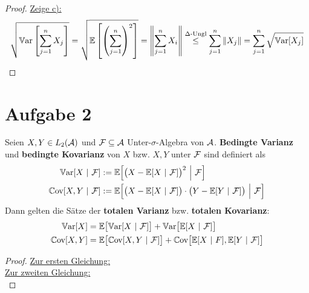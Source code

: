 \documentclass[12pt,a4paper]{article}
\begin{document}
\begin{proof}
\underline{Zeige c):}\\
\begin{align*}
\sqrt{\mathbb{V}\text{ar}\left[\sum\limits_{j=1}^n X_j\right]}
=\sqrt{\mathbb{E}\left[\left(\sum\limits_{j=1}^n\right)^2\right]}
=\left\Vert\sum\limits_{j=1}^n X_i\right\Vert
\stackrel{\Delta\text{-Ungl}}{\leq}
\sum\limits_{j=1}^n\Vert X_j\Vert
=\sum\limits_{j=1}^n\sqrt{\mathbb{V}\text{ar}[X_j]}
\end{align*}
\end{proof}

\section*{Aufgabe 2}
Seien $X,Y\in L_2(\mathcal{A})$ und $\mathcal{F}\subseteq\mathcal{A}$ Unter-$\sigma$-Algebra von $\mathcal{A}$. \textbf{Bedingte Varianz} und \textbf{bedingte Kovarianz} von $X$ bzw. $X,Y$ unter $\mathcal{F}$ sind definiert als
\begin{align*}
\mathbb{V}\text{ar}[X~|~\mathcal{F}]&:=\mathbb{E}\Big[\big(X-\mathbb{E}[X~|~\mathcal{F}]\big)^2~\Big|~\mathcal{F}\Big]\\
\mathbb{C}\text{ov}[X,Y~|~\mathcal{F}]&:=\mathbb{E}\Big[\big(X-\mathbb{E}[X~|~\mathcal{F}]\big)\cdot\big(Y-\mathbb{E}[Y~|~\mathcal{F}]\big)~\Big|~\mathcal{F}\Big]
\end{align*}
Dann gelten die Sätze der \textbf{totalen Varianz} bzw. \textbf{totalen Kovarianz}:
\begin{align*}
\mathbb{V}\text{ar}[X]&=\mathbb{E}\big[\mathbb{V}\text{ar}[X~|~\mathcal{F}]\big]+\mathbb{V}\text{ar}\big[\mathbb{E}[X~|~\mathcal{F}]\big]\\
\mathbb{C}\text{ov}[X,Y]&=\mathbb{E}\big[\mathbb{C}\text{ov}[X,Y~|~\mathcal{F}]\big]+\mathbb{C}\text{ov}\big[\mathbb{E}[X~|~F],\mathbb{E}[Y~|~\mathcal{F}]\big]
\end{align*}
\begin{proof}
\underline{Zur ersten Gleichung:}\\

\underline{Zur zweiten Gleichung:}\\
\end{proof}
\end{document}
